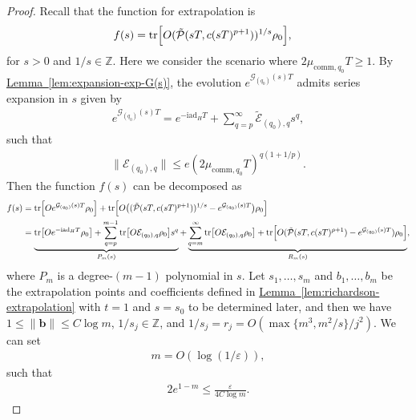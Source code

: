 \documentclass[11pt]{article}
\newcommand{\lem}[1]{\hyperref[lem:#1]{Lemma~\ref*{lem:#1}}}
\renewcommand{\i}{\mathrm{i}}
\newcommand{\ad}{\mathrm{ad}}
\newcommand{\G}{\mathcal{G}}
\newcommand{\E}{\mathcal{E}}
\newcommand{\eps}{\varepsilon}
\newcommand{\mc}{\mathcal}
\newcommand{\mb}{\mathbb}
\begin{document}
\begin{proof}
    Recall that the function for extrapolation is \begin{align*}
        f(s)&=\tr[O(\tilde{\mc P}(sT, c(sT)^{p+1}))^{1/s}\rho_0],
    \end{align*}
    for $s>0$ and $1/s\in \mb Z$.
    Here we consider the scenario where $2\mu_{\mathrm{comm},q_0} T \ge 1$. By \lem{expansion-exp-G(s)}, the evolution $e^{\G_{(q_0)}(s) T}$ admits series expansion in $s$ given by \begin{align*}
        e^{\G_{(q_0)}(s) T}=e^{-\i \ad_H T}+ \sum_{q=p}^{\infty}\tilde{\E}_{(q_0),q} s^q,
    \end{align*}
    such that \begin{align*}
        \|\E_{(q_0), q}\|\le e (2\mu_{\mathrm{comm},q_0}T)^{q(1+1/p)}.
    \end{align*}    
    Then the function $f(s)$ can be decomposed as \begin{align*}
        f(s)&= \tr[Oe^{\G_{(q_0)}(s)T} \rho_0]+\tr[O\bigl((\tilde{\mc P}(sT, c(sT)^{p+1}))^{1/s}-e^{\G_{(q_0)}(s)T}\bigr)\rho_0] \\
        &= \underbrace{\tr[Oe^{-\i \ad_H T}\rho_0]+\sum_{q=p}^{m-1}\tr[O \E_{(q_0), q}\rho_0] s^q}_{P_m(s)}+\underbrace{\sum_{q=m}^{\infty}\tr[O\E_{(q_0), q}\rho_0] + \tr[O(\tilde{\mc P}(sT, c(sT)^{p+1})-e^{\G_{(q_0)}(s)T})\rho_0]}_{R_m(s)},
    \end{align*}
    where $P_m$ is a degree-$(m-1)$ polynomial in $s$. Let $s_1, \ldots, s_m$ and $b_1, \ldots, b_m$ be the extrapolation points and coefficients defined in \lem{richardson-extrapolation} with $t=1$ and $s = s_0$ to be determined later, and then we have $1\le\|\mathbf{b}\|\le C\log m$, $1/s_j\in \mathbb{Z}$, and $1/s_j = r_j = O(\max\{m^3, m^2/s\}/j^2)$. We can set \begin{align*}
        m = O(\log(1/\eps)),
    \end{align*}
    such that \begin{align}
    \label{eq:cond-m}
        2e^{1-m} \le \frac{\eps}{4C\log m}.
    \end{align}
    

\end{proof}
\end{document}
